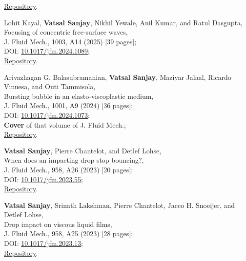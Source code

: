 	\faGithub\hspace{0.2em}\href{https://github.com/VatsalSy/The-role-of-viscosity-on-drop-impact-forces}{Repository}.

	\item Lohit Kayal, \textbf{Vatsal Sanjay}, Nikhil Yewale, Anil Kumar, and Ratul Dasgupta,\\
	Focusing of concentric free-surface waves,\\
	J. Fluid Mech., 1003, A14 (2025) [39 pages];\\
	\faFile\hspace{0.2em}DOI: \href{https://doi.org/10.1017/jfm.2024.1089}{10.1017/jfm.2024.1089};\\
	\faGithub\hspace{0.2em}\href{https://github.com/comphy-lab/concentricWave}{Repository}.

	\item Arivazhagan G. Balasubramanian, \textbf{Vatsal Sanjay}, Maziyar Jalaal, Ricardo Vinuesa, and Outi Tammisola,\\
	Bursting bubble in an elasto-viscoplastic medium,\\
	J. Fluid Mech., 1001, A9 (2024) [36 pages];\\
	\faFile\hspace{0.2em}DOI: \href{https://doi.org/10.1017/jfm.2024.1073}{10.1017/jfm.2024.1073};\\
	\faStar\hspace{0.2em}\textbf{Cover} of that volume of J. Fluid Mech.;\\
	\faGithub\hspace{0.2em}\href{https://github.com/comphy-lab/2023_Bubble-bursting-in-an-elasto-viscoplastic-medium}{Repository}.

	\item \textbf{Vatsal Sanjay}, Pierre Chantelot, and Detlef Lohse,\\
	When does an impacting drop stop bouncing?,\\
	J. Fluid Mech., 958, A26 (2023) [20 pages];\\
	\faFile\hspace{0.2em}DOI: \href{https://doi.org/10.1017/jfm.2023.55}{10.1017/jfm.2023.55};\\
	\faGithub\hspace{0.2em}\href{https://github.com/comphy-lab/Drop-Impact}{Repository}.

	\item \textbf{Vatsal Sanjay}, Srinath Lakshman, Pierre Chantelot, Jacco H. Snoeijer, and Detlef Lohse,\\
	Drop impact on viscous liquid films,\\
	J. Fluid Mech., 958, A25 (2023) [28 pages];\\
	\faFile\hspace{0.2em}DOI: \href{https://doi.org/10.1017/jfm.2023.13}{10.1017/jfm.2023.13};\\
	\faGithub\hspace{0.2em}\href{https://github.com/VatsalSy/Drop-impact-on-viscous-liquid-films}{Repository}.

